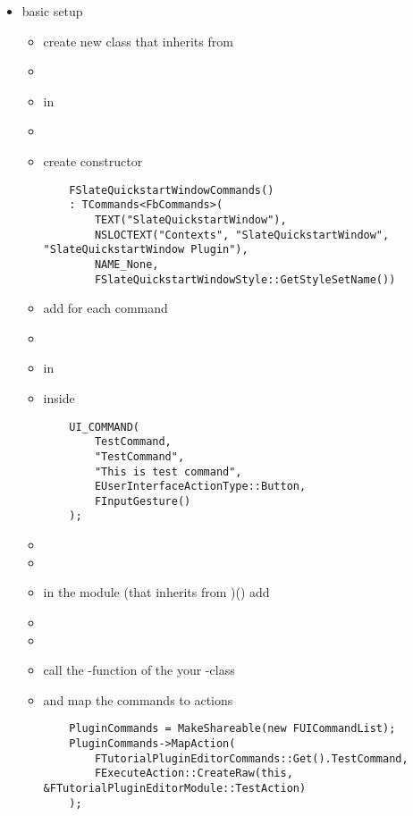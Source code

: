         \begin{itemize}
            \item basic setup
            \begin{itemize}
                \item create new class that inherits from 
                \item   
                \item in  
                \item {}
                \item create constructor
                \begin{lstlisting}
    FSlateQuickstartWindowCommands()
    : TCommands<FbCommands>(
        TEXT("SlateQuickstartWindow"),
        NSLOCTEXT("Contexts", "SlateQuickstartWindow", "SlateQuickstartWindow Plugin"),
        NAME_None,
        FSlateQuickstartWindowStyle::GetStyleSetName())
                \end{lstlisting}
                \item add  for each command
                \item  
                \item in  
                \item inside 
                \begin{lstlisting}
    UI_COMMAND(
        TestCommand,
        "TestCommand", 
        "This is test command", 
        EUserInterfaceActionType::Button, 
        FInputGesture()
    );
                \end{lstlisting} 
                \item 
                \item 
                \item in the module (that inherits from )() add
                \item {}
                \item 
                \item call the -function of the your -class
                \item and map the commands to actions
                \begin{lstlisting}
    PluginCommands = MakeShareable(new FUICommandList);
    PluginCommands->MapAction(
        FTutorialPluginEditorCommands::Get().TestCommand,
        FExecuteAction::CreateRaw(this, &FTutorialPluginEditorModule::TestAction)
    );
                \end{lstlisting}
            \end{itemize}
        \end{itemize}


